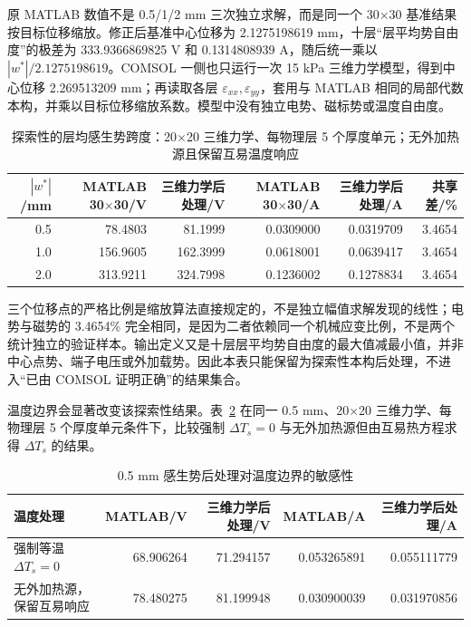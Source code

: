 \documentclass[UTF8,fontset=windows,11pt,a4paper]{ctexart}
\begin{document}
原 MATLAB 数值不是 0.5/1/2 mm 三次独立求解，而是同一个 30$\times$30 基准结果按目标位移缩放。修正后基准中心位移为 2.1275198619 mm，十层“层平均势自由度”的极差为 333.9366869825 V 和 0.1314808939 A，随后统一乘以 $|w^*|/2.1275198619$。COMSOL 一侧也只运行一次 15 kPa 三维力学模型，得到中心位移 2.269513209 mm；再读取各层 $\varepsilon_{xx},\varepsilon_{yy}$，套用与 MATLAB 相同的局部代数本构，并乘以目标位移缩放系数。模型中没有独立电势、磁标势或温度自由度。

\begin{table}[H]
\centering
\caption{探索性的层均感生势跨度：20$\times$20 三维力学、每物理层 5 个厚度单元；无外加热源且保留互易温度响应}
\label{tab:inverse_sensing_exploratory}
\scriptsize
\begin{tabular}{rrrrrr}
\toprule
$|w^*|$/mm & MATLAB 30$\times$30/V & 三维力学后处理/V & MATLAB 30$\times$30/A & 三维力学后处理/A & 共享差/\% \\
\midrule
0.5 & 78.4803 & 81.1999 & 0.0309000 & 0.0319709 & 3.4654 \\
1.0 & 156.9605 & 162.3999 & 0.0618001 & 0.0639417 & 3.4654 \\
2.0 & 313.9211 & 324.7998 & 0.1236002 & 0.1278834 & 3.4654 \\
\bottomrule
\end{tabular}
\end{table}

三个位移点的严格比例是缩放算法直接规定的，不是独立幅值求解发现的线性；电势与磁势的 3.4654\% 完全相同，是因为二者依赖同一个机械应变比例，不是两个统计独立的验证样本。输出定义又是十层层平均势自由度的最大值减最小值，并非中心点势、端子电压或外加载势。因此本表只能保留为探索性本构后处理，不进入“已由 COMSOL 证明正确”的结果集合。

温度边界会显著改变该探索性结果。表~\ref{tab:inverse_sensing_thermal_boundary} 在同一 0.5 mm、20$\times$20 三维力学、每物理层 5 个厚度单元条件下，比较强制 $\Delta T_s=0$ 与无外加热源但由互易热方程求得 $\Delta T_s$ 的结果。

\begin{table}[H]
\centering
\caption{0.5 mm 感生势后处理对温度边界的敏感性}
\label{tab:inverse_sensing_thermal_boundary}
\scriptsize
\begin{tabular}{lrrrr}
\toprule
温度处理 & MATLAB/V & 三维力学后处理/V & MATLAB/A & 三维力学后处理/A \\
\midrule
强制等温 $\Delta T_s=0$ & 68.906264 & 71.294157 & 0.053265891 & 0.055111779 \\
无外加热源，保留互易响应 & 78.480275 & 81.199948 & 0.030900039 & 0.031970856 \\
\bottomrule
\end{tabular}
\end{table}
\end{document}
